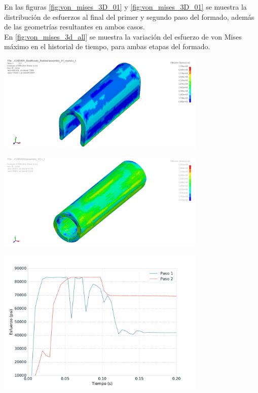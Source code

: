 En las figuras \ref{fig:von_mises_3D_01} y \ref{fig:von_mises_3D_01} se muestra la distribución 
de esfuerzos al final del primer y segundo paso del formado, además de las geometrías 
resultantes en ambos casos.\\

En \ref{fig:von_mises_3d_all} se muestra la variación del esfuerzo de von Mises máximo en 
el historial de tiempo, para ambas etapas del formado.

\begin{center}
\includegraphics[width=0.75\textwidth]{src/ch4/von_mises_3D_01.png}
\label{fig:von_mises_3D_01}
\end{center}

\begin{center}
\includegraphics[width=0.75\textwidth]{src/ch4/von_mises_3D_02.png}
\label{fig:von_mises_3D_02}
\end{center}

\begin{center}
\includegraphics[width=0.75\textwidth]{src/ch4/von_mises_3d_all.pdf}
\label{fig:von_mises_3d_all}
\end{center}

